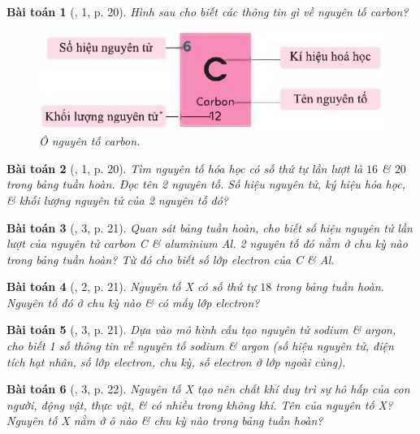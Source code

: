 \documentclass{article}
\newtheorem{baitoan}{Bài toán}
\begin{document}
\begin{baitoan}[\cite{SGK_KHTN_7_Canh_Dieu}, 1, p. 20]
	Hình sau cho biết các thông tin gì về nguyên tố carbon?
	\begin{figure}[H]
		\centering
		\includegraphics[scale=0.3]{carbon_element}
		\caption{Ô nguyên tố carbon.}
	\end{figure}
\end{baitoan}

\begin{baitoan}[\cite{SGK_KHTN_7_Canh_Dieu}, 1, p. 20]
	Tìm nguyên tố hóa học có số thứ tự lần lượt là $16$ \& $20$ trong bảng tuần hoàn. Đọc tên 2 nguyên tố. Số hiệu nguyên tử, ký hiệu hóa học, \& khối lượng nguyên tử của 2 nguyên tố đó?
\end{baitoan}

\begin{baitoan}[\cite{SGK_KHTN_7_Canh_Dieu}, 3, p. 21]
	Quan sát bảng tuần hoàn, cho biết số hiệu nguyên tử lần lượt của nguyên tử carbon \emph{C} \& aluminium \emph{Al}. 2 nguyên tố đó nằm ở chu kỳ nào trong bảng tuần hoàn? Từ đó cho biết số lớp electron của \emph{C} \& \emph{Al}.
\end{baitoan}

\begin{baitoan}[\cite{SGK_KHTN_7_Canh_Dieu}, 2, p. 21]
	Nguyên tố X có số thứ tự $18$ trong bảng tuần hoàn. Nguyên tố đó ở chu kỳ nào \& có mấy lớp electron?
\end{baitoan}

\begin{baitoan}[\cite{SGK_KHTN_7_Canh_Dieu}, 3, p. 21]
	Dựa vào mô hình cấu tạo nguyên tử sodium \& argon, cho biết 1 số thông tin về nguyên tố sodium \& argon (số hiệu nguyên tử, điện tích hạt nhân, số lớp electron, chu kỳ, số electron ở lớp ngoài cùng).
\end{baitoan}

\begin{baitoan}[\cite{SGK_KHTN_7_Canh_Dieu}, 3, p. 22]
	Nguyên tố X tạo nên chất khí duy trì sự hô hấp của con người, động vật, thực vật, \& có nhiều trong không khí. Tên của nguyên tố X? Nguyên tố X nằm ở ô nào \& chu kỳ nào trong bảng tuần hoàn?
\end{baitoan}
\end{document}
